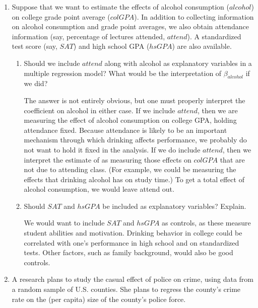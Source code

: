\documentclass[
]{article}
\providecommand{\tightlist}{%
  \setlength{\itemsep}{0pt}\setlength{\parskip}{0pt}}
\begin{document}
\begin{enumerate}
\def\labelenumi{\arabic{enumi}.}
\item
  Suppose that we want to estimate the effects of alcohol consumption
  (\(alcohol\)) on college grade point average (\(colGPA\)). In addition
  to collecting information on alcohol consumption and grade point
  averages, we also obtain attendance information (say, percentage of
  lectures attended, \(attend\)). A standardized test score (say,
  \(SAT\)) and high school GPA (\(hsGPA\)) are also available.

  \begin{enumerate}
  \def\labelenumii{\alph{enumii}.}
  \tightlist
  \item
    Should we include \(attend\) along with alcohol as explanatory
    variables in a multiple regression model? What would be the
    interpretation of \(\beta_{alcohol}\) if we did?
    
    
    {\color{red} 
    The answer is not entirely obvious, but one must properly interpret the coefficient on alcohol in either case.  If we include $attend$, then we are measuring the effect of alcohol consumption on college GPA, holding attendance fixed.  Because attendance is likely to be an important mechanism through which drinking affects performance, we probably do not want to hold it fixed in the analysis.  If we do include $attend$, then we interpret the estimate of  as measuring those effects on $colGPA$ that are not due to attending class.  (For example, we could be measuring the effects that drinking alcohol has on study time.)  To get a total effect of alcohol consumption, we would leave attend out.} 
    
  \item
    Should \(SAT\) and \(hsGPA\) be included as explanatory variables?
    Explain.
    
        {\color{red} We would want to include $SAT$ and $hsGPA$ as controls, as these measure student abilities and motivation.  Drinking behavior in college could be correlated with one's performance in high school and on standardized tests.  Other factors, such as family background, would also be good controls.}
    
  \end{enumerate}
  
  
  
\item
  A research plans to study the casual effect of police on crime, using
  data from a random sample of U.S. counties. She plans to regress the
  county's crime rate on the (per capita) size of the county's police
  force.


\end{enumerate}
\end{document}
